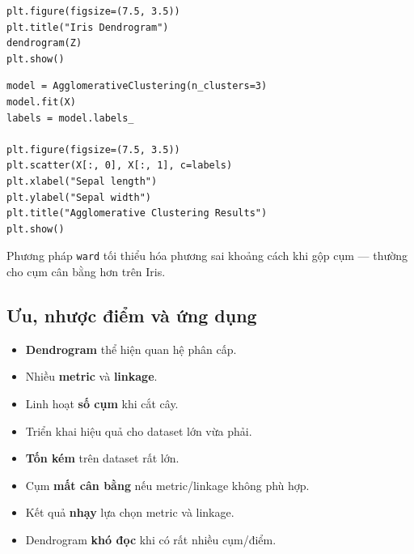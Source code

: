 \begin{vidu}[title={Vẽ dendrogram}]
\begin{lstlisting}
plt.figure(figsize=(7.5, 3.5))
plt.title("Iris Dendrogram")
dendrogram(Z)
plt.show()
\end{lstlisting}
\end{vidu}


\begin{vidu}[title={AgglomerativeClustering và scatter kết quả}]
\begin{lstlisting}
model = AgglomerativeClustering(n_clusters=3)
model.fit(X)
labels = model.labels_

plt.figure(figsize=(7.5, 3.5))
plt.scatter(X[:, 0], X[:, 1], c=labels)
plt.xlabel("Sepal length")
plt.ylabel("Sepal width")
plt.title("Agglomerative Clustering Results")
plt.show()
\end{lstlisting}
\end{vidu}


\begin{ynghia}[title={ward}]
Phương pháp \texttt{ward} tối thiểu hóa phương sai khoảng cách khi gộp cụm --- thường cho cụm cân bằng hơn trên Iris.
\end{ynghia}

\subsection{Ưu, nhược điểm và ứng dụng}

\begin{tinhchat}[title={Ưu điểm}]
\begin{itemize}
  \item \textbf{Dendrogram} thể hiện quan hệ phân cấp.
  \item Nhiều \textbf{metric} và \textbf{linkage}.
  \item Linh hoạt \textbf{số cụm} khi cắt cây.
  \item Triển khai hiệu quả cho dataset lớn vừa phải.
\end{itemize}
\end{tinhchat}

\begin{luuy}[title={Nhược điểm}]
\begin{itemize}
  \item \textbf{Tốn kém} trên dataset rất lớn.
  \item Cụm \textbf{mất cân bằng} nếu metric/linkage không phù hợp.
  \item Kết quả \textbf{nhạy} lựa chọn metric và linkage.
  \item Dendrogram \textbf{khó đọc} khi có rất nhiều cụm/điểm.
\end{itemize}
\end{luuy}

